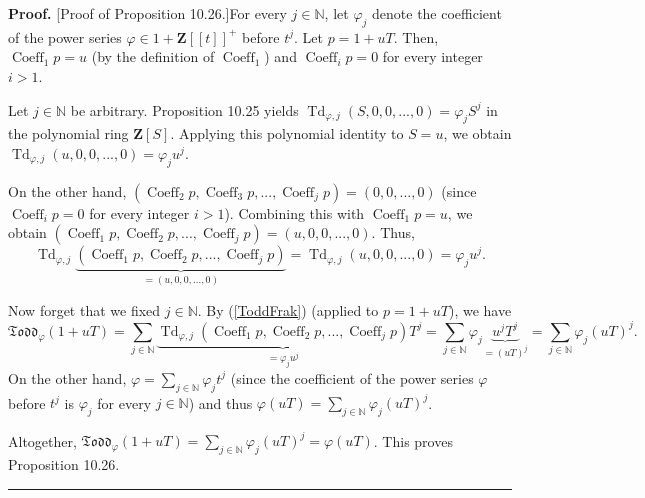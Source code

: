 \documentclass[numbers=enddot,12pt,final,onecolumn,notitlepage]{scrartcl}%
\newenvironment{proof}[1][Proof]{\noindent\textbf{#1.} }{\ \rule{0.5em}{0.5em}}
\begin{document}
\begin{proof}
[Proof of Proposition 10.26.]For every $j\in\mathbb{N}$, let $\varphi_{j}$
denote the coefficient of the power series $\varphi\in1+\mathbf{Z}\left[
\left[  t\right]  \right]  ^{+}$ before $t^{j}$. Let $p=1+uT$. Then,
$\operatorname*{Coeff}\nolimits_{1}p=u$ (by the definition of
$\operatorname*{Coeff}\nolimits_{1}$) and $\operatorname*{Coeff}%
\nolimits_{i}p=0$ for every integer $i>1$.

Let $j\in\mathbb{N}$ be arbitrary. Proposition 10.25 yields
$\operatorname*{Td}\nolimits_{\varphi,j}\left(  S,0,0,...,0\right)
=\varphi_{j}S^{j}$ in the polynomial ring $\mathbf{Z}\left[  S\right]  $.
Applying this polynomial identity to $S=u$, we obtain $\operatorname*{Td}%
\nolimits_{\varphi,j}\left(  u,0,0,...,0\right)  =\varphi_{j}u^{j}$.

On the other hand, $\left(  \operatorname*{Coeff}\nolimits_{2}%
p,\operatorname*{Coeff}\nolimits_{3}p,...,\operatorname*{Coeff}\nolimits_{j}%
p\right)  =\left(  0,0,...,0\right)  $ (since $\operatorname*{Coeff}%
\nolimits_{i}p=0$ for every integer $i>1$). Combining this with
$\operatorname*{Coeff}\nolimits_{1}p=u$, we obtain $\left(
\operatorname*{Coeff}\nolimits_{1}p,\operatorname*{Coeff}\nolimits_{2}%
p,...,\operatorname*{Coeff}\nolimits_{j}p\right)  =\left(  u,0,0,...,0\right)
$. Thus,%
\[
\operatorname*{Td}\nolimits_{\varphi,j}\underbrace{\left(
\operatorname*{Coeff}\nolimits_{1}p,\operatorname*{Coeff}\nolimits_{2}%
p,...,\operatorname*{Coeff}\nolimits_{j}p\right)  }_{=\left(
u,0,0,...,0\right)  }=\operatorname*{Td}\nolimits_{\varphi,j}\left(
u,0,0,...,0\right)  =\varphi_{j}u^{j}.
\]


Now forget that we fixed $j\in\mathbb{N}$. By (\ref{ToddFrak}) (applied to
$p=1+uT$), we have%
\[
\mathfrak{Todd}_{\varphi}\left(  1+uT\right)  =\sum\limits_{j\in\mathbb{N}%
}\underbrace{\operatorname*{Td}\nolimits_{\varphi,j}\left(
\operatorname*{Coeff}\nolimits_{1}p,\operatorname*{Coeff}\nolimits_{2}%
p,...,\operatorname*{Coeff}\nolimits_{j}p\right)  }_{=\varphi_{j}u^{j}}%
T^{j}=\sum\limits_{j\in\mathbb{N}}\varphi_{j}\underbrace{u^{j}T^{j}}_{=\left(
uT\right)  ^{j}}=\sum\limits_{j\in\mathbb{N}}\varphi_{j}\left(  uT\right)
^{j}.
\]
On the other hand, $\varphi=\sum\limits_{j\in\mathbb{N}}\varphi_{j}t^{j}$
(since the coefficient of the power series $\varphi$ before $t^{j}$ is
$\varphi_{j}$ for every $j\in\mathbb{N}$) and thus $\varphi\left(  uT\right)
=\sum\limits_{j\in\mathbb{N}}\varphi_{j}\left(  uT\right)  ^{j}$.

Altogether, $\mathfrak{Todd}_{\varphi}\left(  1+uT\right)  =\sum
\limits_{j\in\mathbb{N}}\varphi_{j}\left(  uT\right)  ^{j}=\varphi\left(
uT\right)  $. This proves Proposition 10.26.
\end{proof}
\end{document}
